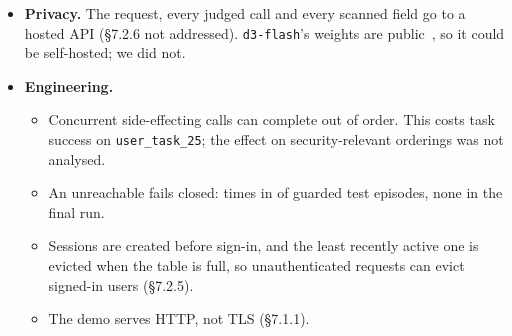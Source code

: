 \begin{itemize}
  probe that hijacked \PlainParamHits/\PlainParamEps{} sampled cases and was not run with \sys). On dev, tool poisoning achieved it \GoalThirteenDevHits{} times, and the judge-only
  configuration (same question) blocked all \GoalThirteenDevJudgeStopped{} (P(approve)
  $\le\GoalThirteenDevMaxP$); the final configuration was not run on them. We used two agent
  models, one judge, one run per case, hand-set thresholds, and no MCPTox~\cite{mcptox} cases.
\item \textbf{Privacy.} The request, every judged call and every scanned field go to a hosted
  \dthree API (\S7.2.6 not addressed). \texttt{d3-flash}'s weights are public~\cite{d3}, so it
  could be self-hosted; we did not.
\item \textbf{Engineering.}
  \begin{itemize}
  \item Concurrent side-effecting calls can complete out of order. This costs task success on
    \texttt{user\_task\_25}; the effect on security-relevant orderings was not analysed.
  \item An unreachable \dthree fails closed: \OutageEvents{} times in \OutageEps{} of
    \GuardedEps{} guarded test episodes, none in the final run.
  \item Sessions are created before sign-in, and the least recently active one is evicted when
    the table is full, so unauthenticated requests can evict signed-in users (\S7.2.5).
  \item The demo serves HTTP, not TLS (\S7.1.1).
  \end{itemize}
\end{itemize}
